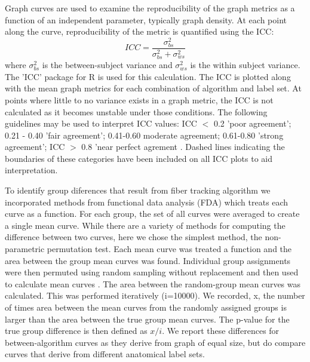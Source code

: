 \documentclass{frontiersSCNS} %
\newcommand{\R}{R}
\begin{document}
Graph curves are used to examine the reproducibility of the graph metrics as a function of an independent parameter, typically graph density. At each point along the curve, reproducibility of the metric is quantified using the ICC:
$$ICC = \frac{\sigma_{bs}^{2}}{\sigma_{bs}^{2} + \sigma_{ws}^{2}} $$
where $\sigma_{bs}^{2}$ is the between-subject variance and $\sigma_{ws}^{2}$ is the within subject variance. The 'ICC' package for  \R{} is used for this calculation. The ICC is plotted along with the mean graph metrics for each combination of algorithm and label set. At points where little to no variance exists in a graph metric, the ICC is not calculated as it becomes unstable under those conditions. The following guidelines may be used to interpret ICC values: ICC $<$ 0.2 'poor agreement'; 0.21 - 0.40 'fair agreement'; 0.41-0.60 moderate agreement; 0.61-0.80 'strong agreement'; ICC $>$ 0.8 'near perfect agrement \citep{Telesford2010,Montgomery2002}. Dashed lines indicating the boundaries of these categories have been included on all ICC plots to aid interpretation.

To identify group diferences that result from fiber tracking algorithm we incorporated methods from functional data analysis (FDA) which treats each curve as a function. For each group, the set of all curves were averaged to create a single mean curve.  While there are a variety of methods for computing the difference between two curves, here we chose the simplest method, the non-parametric permutation test. Each mean curve was treated a function and the area between the group mean curves was found. Individual group assignments were then permuted using random sampling without replacement and then  used to calculate mean curves . The area between the random-group mean curves was calculated. This was performed iteratively (i=10000). We recorded, x, the number of times area between the mean curves from the randomly assigned groups is larger than the area between the true group mean curves. The p-value for the true group difference is then defined as $x/i$. We report these differences for between-algorithm curves as they derive from graph of equal size, but do compare curves that derive from different anatomical label sets.

\end{document}
